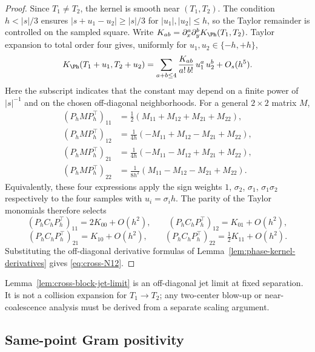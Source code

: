 \begin{proof}
Since \(T_1 \ne T_2\), the kernel is smooth near \((T_1, T_2)\).  The
condition \(h<|s|/3\) ensures
\(|s+u_1-u_2|\ge |s|/3\) for \(|u_1|,|u_2|\le h\), so the Taylor
remainder is controlled on the sampled square.  Write
\(K_{ab} = \partial_x^a \partial_y^b K_\Ph(T_1, T_2)\).  Taylor
expansion to total order four gives, uniformly for
\(u_1, u_2 \in \{-h, +h\}\),
\[
K_\Ph(T_1+u_1, T_2+u_2)
= \sum_{a+b\le 4}\frac{K_{ab}}{a!\,b!}\, u_1^a\, u_2^b + O_s(h^5).
\]
Here the subscript indicates that the constant may depend on a finite
power of \(|s|^{-1}\) and on the chosen off-diagonal neighborhoods.
For a general \(2\times 2\) matrix \(M\),
\begin{align*}
(P_h M P_h^\top)_{11}
&= \tfrac12(M_{11} + M_{12} + M_{21} + M_{22}),\\
(P_h M P_h^\top)_{12}
&= \tfrac{1}{4h}(-M_{11} + M_{12} - M_{21} + M_{22}),\\
(P_h M P_h^\top)_{21}
&= \tfrac{1}{4h}(-M_{11} - M_{12} + M_{21} + M_{22}),\\
(P_h M P_h^\top)_{22}
&= \tfrac{1}{8h^2}(M_{11} - M_{12} - M_{21} + M_{22}).
\end{align*}
Equivalently, these four expressions apply the sign weights
\(1\), \(\sigma_2\), \(\sigma_1\), \(\sigma_1\sigma_2\) respectively to
the four samples with \(u_i = \sigma_i h\).  The parity of the Taylor
monomials therefore selects
\[
(P_h C_h P_h^\top)_{11} = 2 K_{00} + O(h^2),\qquad
(P_h C_h P_h^\top)_{12} = K_{01} + O(h^2),
\]
\[
(P_h C_h P_h^\top)_{21} = K_{10} + O(h^2),\qquad
(P_h C_h P_h^\top)_{22} = \tfrac12 K_{11} + O(h^2).
\]
Substituting the off-diagonal derivative formulas of
Lemma~\ref{lem:phase-kernel-derivatives} gives \eqref{eq:cross-N12}.
\end{proof}

\begin{remark}
\label{rem:cross-block-fixed-separation-scope}
Lemma~\ref{lem:cross-block-jet-limit} is an off-diagonal jet limit at
fixed separation.  It is not a collision expansion for \(T_1\to T_2\);
any two-center blow-up or near-coalescence analysis must be derived from
a separate scaling argument.
\end{remark}

\subsection{Same-point Gram positivity}
\label{subsec:same-point-gram-positivity}

